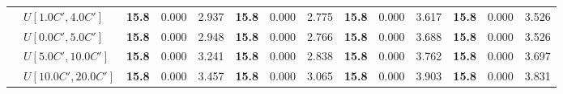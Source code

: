 \begin{table}[h]
{\begin{tabular}{|l|l||l|l|l||l|l|l||l|l|l||l|l|l|}
       & $U[1.0C',4.0C']$ & \textbf{15.8} & 0.000 & 2.937 & \textbf{15.8} & 0.000 & 2.775 & \textbf{15.8} & 0.000 & 3.617 & \textbf{15.8} & 0.000 & 3.526 \\
       & $U[0.0C',5.0C']$ & \textbf{15.8} & 0.000 & 2.948 & \textbf{15.8} & 0.000 & 2.766 & \textbf{15.8} & 0.000 & 3.688 & \textbf{15.8} & 0.000 & 3.526 \\
       & $U[5.0C',10.0C']$ & \textbf{15.8} & 0.000 & 3.241 & \textbf{15.8} & 0.000 & 2.838 & \textbf{15.8} & 0.000 & 3.762 & \textbf{15.8} & 0.000 & 3.697 \\
       & $U[10.0C',20.0C']$ & \textbf{15.8} & 0.000 & 3.457 & \textbf{15.8} & 0.000 & 3.065 & \textbf{15.8} & 0.000 & 3.903 & \textbf{15.8} & 0.000 & 3.831 \\
      \hline
      \end{tabular}
      }
      \label{tab:pcpn90p9ILPVariant}\end{table}
      
